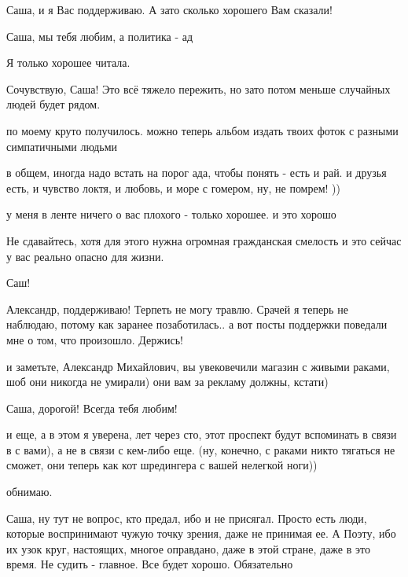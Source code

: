 \begin{itemize}
Саша, и я Вас поддерживаю. А зато сколько хорошего Вам сказали!

Саша, мы тебя любим, а политика - ад

Я только хорошее читала.


Сочувствую, Саша! Это всё тяжело пережить, но зато потом меньше случайных людей
будет рядом.



по моему круто получилось. можно теперь альбом издать твоих фоток с разными симпатичными людьми


в общем, иногда надо встать на порог ада, чтобы понять - есть и рай. и друзья
есть, и чувство локтя, и любовь, и море с гомером, ну, не помрем! ))

у меня в ленте ничего о вас плохого - только хорошее. и это хорошо

Не сдавайтесь, хотя для этого нужна огромная гражданская смелость и это сейчас у вас реально опасно для жизни.

Саш!


Александр, поддерживаю! Терпеть не могу травлю. Срачей я теперь не наблюдаю,
потому как заранее позаботилась.. а вот посты поддержки поведали мне о том, что
произошло. Держись!


и заметьте, Александр Михайлович, вы увековечили магазин с живыми раками, шоб
они никогда не умирали) они вам за рекламу должны, кстати)


Саша, дорогой! Всегда тебя любим!


и еще, а в этом я уверена, лет через сто, этот проспект будут вспоминать в
связи в с вами), а не в связи с кем-либо еще. (ну, конечно, с раками никто
тягаться не сможет, они теперь как кот шредингера с вашей нелегкой ноги))

обнимаю.


Саша, ну тут не вопрос, кто предал, ибо и не присягал. Просто есть люди,
которые воспринимают чужую точку зрения, даже не принимая ее. А Поэту, ибо их
узок круг, настоящих, многое оправдано, даже в этой стране, даже в это время.
Не судить - главное. Все будет хорошо. Обязательно



\end{itemize}
